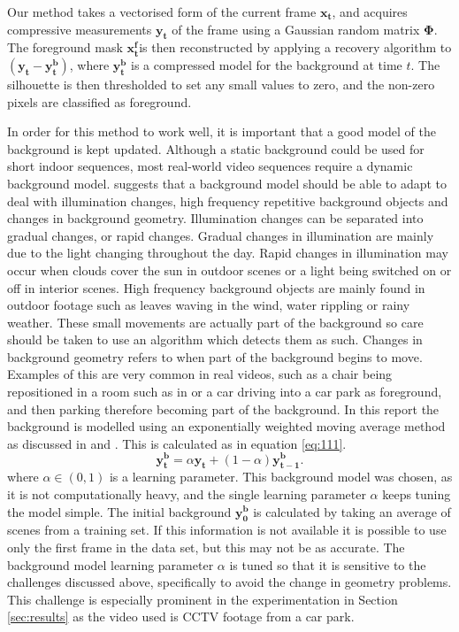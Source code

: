 Our method takes a vectorised form of the current frame $\boldsymbol{x_t}$, and acquires compressive measurements $\boldsymbol{y_t}$ of the frame using a Gaussian random matrix $\boldsymbol{\Phi}$. The foreground mask $\boldsymbol{x_t^f} $is then reconstructed by applying a recovery algorithm  to $(\boldsymbol{y_t} - \boldsymbol{y_t^b})$, where $\boldsymbol{y_t^b}$ is a compressed model for the background at time $t$. The silhouette is then thresholded to set any small values to zero, and the non-zero pixels are classified as foreground. 

In order for this method to work well, it is important that a good model of the background is kept updated. Although a static background could be used for short indoor sequences, most real-world video sequences require a dynamic background model. \cite{Piccardi2004a} suggests that a background model should be able to adapt to deal with illumination changes, high frequency repetitive background objects and changes in background geometry. Illumination changes can be separated into gradual changes, or rapid changes. Gradual changes in illumination are mainly due to the light changing throughout the day. Rapid changes in illumination may occur when clouds cover the sun in outdoor scenes or a light being switched on or off in interior scenes. High frequency background objects are mainly found in outdoor footage such as leaves waving in the wind, water rippling or rainy weather. These small movements are actually part of the background so care should be taken to use an algorithm which detects them as such.  Changes in background geometry refers to when part of the background begins to move. Examples of this are very common in real videos, such as a chair being repositioned in a room such as in \cite{toyama1999} or a car driving into a car park as foreground, and then parking therefore becoming part of the background. In this report the background is modelled using an exponentially weighted moving average method as discussed in \cite{Piccardi2004a} and \cite{Cossalter2009}. This is calculated as in equation \eqref{eq:111}.
\begin{equation}
  \label{eq:111}
  \boldsymbol{y_t^b} = \alpha \boldsymbol{y_t} + (1 - \alpha) \boldsymbol{y^b_{t-1}}.
\end{equation}
 where $\alpha \in (0,1)$ is a learning parameter.
This background model was chosen, as it is not computationally heavy, and the single learning parameter $\alpha$ keeps tuning the model simple. The initial background $\boldsymbol{y^b_0}$ is calculated by taking an average of scenes from a training set. If this information is not available it is possible to use only the first frame in the data set, but this may not be as accurate. The background model learning parameter $\alpha$ is tuned so that it is sensitive to the challenges discussed above, specifically to avoid the change in geometry problems. This challenge is especially prominent in the experimentation in Section \ref{sec:results} as the video used is CCTV footage from a car park.   

